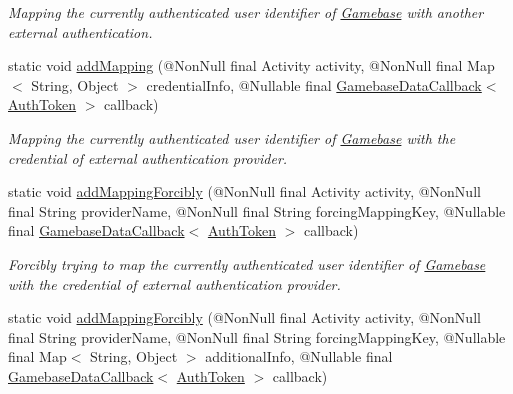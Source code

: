 \begin{DoxyCompactItemize}
\begin{DoxyCompactList}\small\item\em Mapping the currently authenticated user identifier of \hyperlink{classcom_1_1toast_1_1android_1_1gamebase_1_1_gamebase}{Gamebase} with another external authentication. \end{DoxyCompactList}\item 
static void \hyperlink{classcom_1_1toast_1_1android_1_1gamebase_1_1_gamebase_a5152b09c5542e5442ed94f0f541ae1d5}{add\+Mapping} (@Non\+Null final Activity activity, @Non\+Null final Map$<$ String, Object $>$ credential\+Info, @Nullable final \hyperlink{interfacecom_1_1toast_1_1android_1_1gamebase_1_1_gamebase_data_callback}{Gamebase\+Data\+Callback}$<$ \hyperlink{classcom_1_1toast_1_1android_1_1gamebase_1_1auth_1_1data_1_1_auth_token}{Auth\+Token} $>$ callback)
\begin{DoxyCompactList}\small\item\em Mapping the currently authenticated user identifier of \hyperlink{classcom_1_1toast_1_1android_1_1gamebase_1_1_gamebase}{Gamebase} with the credential of external authentication provider. \end{DoxyCompactList}\item 
static void \hyperlink{classcom_1_1toast_1_1android_1_1gamebase_1_1_gamebase_a06dbc31c4c9e171737dee6403837b923}{add\+Mapping\+Forcibly} (@Non\+Null final Activity activity, @Non\+Null final String provider\+Name, @Non\+Null final String forcing\+Mapping\+Key, @Nullable final \hyperlink{interfacecom_1_1toast_1_1android_1_1gamebase_1_1_gamebase_data_callback}{Gamebase\+Data\+Callback}$<$ \hyperlink{classcom_1_1toast_1_1android_1_1gamebase_1_1auth_1_1data_1_1_auth_token}{Auth\+Token} $>$ callback)
\begin{DoxyCompactList}\small\item\em Forcibly trying to map the currently authenticated user identifier of \hyperlink{classcom_1_1toast_1_1android_1_1gamebase_1_1_gamebase}{Gamebase} with the credential of external authentication provider. \end{DoxyCompactList}\item 
static void \hyperlink{classcom_1_1toast_1_1android_1_1gamebase_1_1_gamebase_af9f8a372c5b76389cde5f7552a041ee6}{add\+Mapping\+Forcibly} (@Non\+Null final Activity activity, @Non\+Null final String provider\+Name, @Non\+Null final String forcing\+Mapping\+Key, @Nullable final Map$<$ String, Object $>$ additional\+Info, @Nullable final \hyperlink{interfacecom_1_1toast_1_1android_1_1gamebase_1_1_gamebase_data_callback}{Gamebase\+Data\+Callback}$<$ \hyperlink{classcom_1_1toast_1_1android_1_1gamebase_1_1auth_1_1data_1_1_auth_token}{Auth\+Token} $>$ callback)

\end{DoxyCompactItemize}
